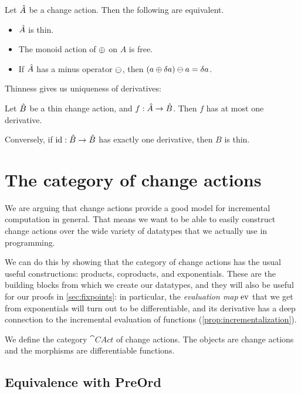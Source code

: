 \begin{prop}
  Let $\hat{A}$ be a change action. Then the following are equivalent.
  \begin{itemize}
    \item $\hat{A}$ is thin.
    \item The monoid action of $\oplus$ on $A$ is free.
    \item If $\hat{A}$ has a minus operator $\ominus$, then $(a \oplus \delta a)
      \ominus a = \delta a$.
  \end{itemize}
\end{prop}

Thinness gives us uniqueness of derivatives:

\begin{prop}
  Let $\hat{B}$ be a thin change action, and $f: \hat{A} \rightarrow \hat{B}$. Then $f$ has at
  most one derivative.

  Conversely, if $\textrm{id}: \hat{B} \rightarrow \hat{B}$ has exactly one derivative, then
  $B$ is thin.
\end{prop}

\section{The category of change actions}
\label{sec:category}

We are arguing that change actions provide a good model for incremental
computation in general. That means we want to be able to easily construct change
actions over the wide variety of datatypes that we actually use in programming.

We can do this by showing that the category of change actions has the usual
useful constructions: products, coproducts, and exponentials. These are the
building blocks from which we create our datatypes, and they will also be useful
for our proofs in \cref{sec:fixpoints}: in particular, the \emph{evaluation map}
$\operatorname{ev}$ that we get from exponentials will turn out to be differentiable, and its
derivative has a deep connection to the incremental evaluation of functions (\cref{prop:incrementalization}).

\begin{defn}
  We define the category $\cat{CAct}$ of change actions. The objects are
  change actions and the morphisms are differentiable functions. 
\end{defn}

\subsection{Equivalence with PreOrd}

